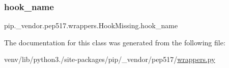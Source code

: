 \subsubsection{\texorpdfstring{hook\+\_\+name}{hook\_name}}
{\footnotesize\ttfamily pip.\+\_\+vendor.\+pep517.\+wrappers.\+Hook\+Missing.\+hook\+\_\+name}



The documentation for this class was generated from the following file\+:\begin{DoxyCompactItemize}
\item 
venv/lib/python3./site-\/packages/pip/\+\_\+vendor/pep517/\hyperlink{wrappers_8py}{wrappers.\+py}\end{DoxyCompactItemize}
